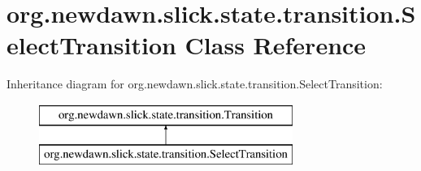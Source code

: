 \hypertarget{classorg_1_1newdawn_1_1slick_1_1state_1_1transition_1_1_select_transition}{}\section{org.\+newdawn.\+slick.\+state.\+transition.\+Select\+Transition Class Reference}
\label{classorg_1_1newdawn_1_1slick_1_1state_1_1transition_1_1_select_transition}
Inheritance diagram for org.\+newdawn.\+slick.\+state.\+transition.\+Select\+Transition\+:\begin{figure}[H]
\begin{center}
\leavevmode
\includegraphics[height=2.000000cm]{classorg_1_1newdawn_1_1slick_1_1state_1_1transition_1_1_select_transition}
\end{center}
\end{figure}
